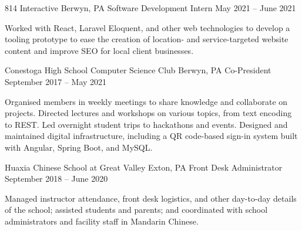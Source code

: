 \documentclass[letterpaper,11pt]{article}
\begin{document}
\begin{rsectionlist}


    \rsectionitem
      {814 Interactive}
      {Berwyn, PA}
      {Software Development Intern}
      {May 2021 -- June 2021}

      Worked with React, Laravel Eloquent, and other web technologies to develop a tooling prototype
      to ease the creation of location- and service-targeted website content and improve SEO for
      local client businesses.

    \rsectionitem
      {Conestoga High School Computer Science Club}
      {Berwyn, PA}
      {Co-President}
      {September 2017 -- May 2021}

      Organised members in weekly meetings to share knowledge and collaborate on projects. Directed
      lectures and workshops on various topics, from text encoding to REST. Led overnight student
      trips to hackathons and events. Designed and maintained digital infrastructure, including a QR
      code-based sign-in system built with Angular, Spring Boot, and MySQL.

    \rsectionitem
      {Huaxia Chinese School at Great Valley}
      {Exton, PA}
      {Front Desk Administrator}
      {September 2018 -- June 2020}

      Managed instructor attendance, front desk logistics, and other day-to-day details of the
      school; assisted students and parents; and coordinated with school administrators and facility
      staff in Mandarin Chinese.
  \end{rsectionlist}




\end{document}
